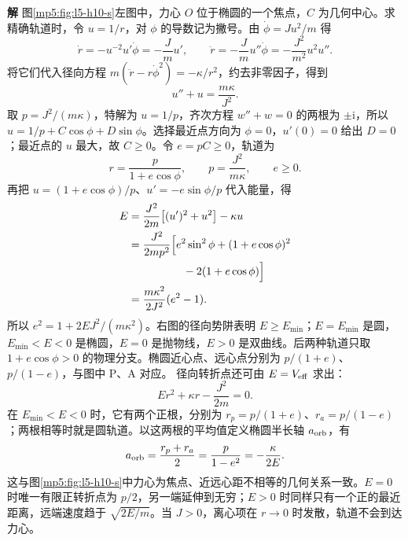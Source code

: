 \documentclass[11pt,openany,fontset=fandol]{ctexbook}
\theoremstyle{definition}\newtheorem{example}{例}[chapter]\newtheorem{exercise}{习题}[chapter]
\newcommand{\SolutionStart}{\par\medskip\ifdim\pagetotal>0pt\ifdim\dimexpr\pagegoal-\pagetotal\relax<3\baselineskip\newpage\fi\fi\noindent\textbf{解}\quad\ignorespaces}
\newenvironment{solution}{\SolutionStart}{\par\medskip}
\begin{document}
\begin{solution}
图\ref{mp5:fig:l5-h10-s}左图中，力心 $O$ 位于椭圆的一个焦点，$C$ 为几何中心。求精确轨道时，令 $u=1/r$，对 $\phi$ 的导数记为撇号。由 $\dot\phi=Ju^2/m$ 得
\[
\dot r=-u^{-2}u'\dot\phi=-\frac Jm u',\qquad
\ddot r=-\frac Jm u''\dot\phi=-\frac{J^2}{m^2}u^2u''.
\]
将它们代入径向方程 $m(\ddot r-r\dot\phi^2)=-\kappa/r^2$，约去非零因子，得到
\[
u''+u=\frac{m\kappa}{J^2}.
\]
取 $p=J^2/(m\kappa)$，特解为 $u=1/p$，齐次方程 $w''+w=0$ 的两根为 $\pm\mathrm i$，所以 $u=1/p+C\cos\phi+D\sin\phi$。选择最近点方向为 $\phi=0$，$u'(0)=0$ 给出 $D=0$；最近点的 $u$ 最大，故 $C\ge0$。令 $e=pC\ge0$，轨道为
\[
\boxed{r=\frac p{1+e\cos\phi},\qquad
p=\frac{J^2}{m\kappa},\qquad e\ge0.}
\]
再把 $u=(1+e\cos\phi)/p$、$u'=-e\sin\phi/p$ 代入能量，得
\begin{align*}
E&=\frac{J^2}{2m}\bigl[(u')^2+u^2\bigr]-\kappa u\\
&=\frac{J^2}{2mp^2}\Bigl[e^2\sin^2\phi+(1+e\cos\phi)^2\\
&\hspace{5em}{}-2(1+e\cos\phi)\Bigr]\\
&=\frac{m\kappa^2}{2J^2}(e^2-1).
\end{align*}
所以 $e^2=1+2EJ^2/(m\kappa^2)$。右图的径向势阱表明 $E\ge E_{\min}$；$E=E_{\min}$ 是圆，$E_{\min}<E<0$ 是椭圆，$E=0$ 是抛物线，$E>0$ 是双曲线。后两种轨道只取 $1+e\cos\phi>0$ 的物理分支。椭圆近心点、远心点分别为 $p/(1+e)$、$p/(1-e)$，与图中 P、A 对应。
径向转折点还可由 $E=V_{\rm eff}$ 求出：
\[
Er^2+\kappa r-\frac{J^2}{2m}=0.
\]
在 $E_{\min}<E<0$ 时，它有两个正根，分别为 $r_p=p/(1+e)$、$r_a=p/(1-e)$；两根相等时就是圆轨道。以这两根的平均值定义椭圆半长轴 $a_{\rm orb}$，有
\[
a_{\rm orb}=\frac{r_p+r_a}{2}=\frac p{1-e^2}
=-\frac\kappa{2E}.
\]
这与图\ref{mp5:fig:l5-h10-s}中力心为焦点、近远心距不相等的几何关系一致。$E=0$ 时唯一有限正转折点为 $p/2$，另一端延伸到无穷；$E>0$ 时同样只有一个正的最近距离，远端速度趋于 $\sqrt{2E/m}$。当 $J>0$，离心项在 $r\to0$ 时发散，轨道不会到达力心。

\end{solution}
\end{document}
